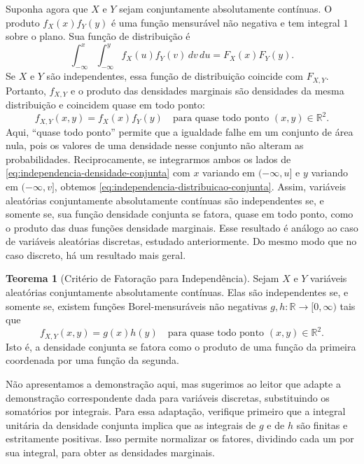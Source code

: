 \documentclass[12pt,portuguese]{article}
\theoremstyle{definition}
\newtheorem{theorem}{Teorema}
\theoremstyle{plainexercise}
\theoremstyle{starredexercise}
\theoremstyle{definition}
\begin{document}
Suponha agora que $X$ e $Y$ sejam conjuntamente absolutamente contínuas.
O produto $f_X(x)f_Y(y)$ é uma função mensurável não negativa e tem
integral $1$ sobre o plano. Sua função de distribuição é
\[
  \int_{-\infty}^{x}\int_{-\infty}^{y}
  f_X(u)f_Y(v)\,dv\,du = F_X(x)F_Y(y).
\]
Se $X$ e $Y$ são independentes, essa função de distribuição coincide com
$F_{X,Y}$. Portanto, $f_{X,Y}$ e o produto das densidades marginais são
densidades da mesma distribuição e coincidem quase em todo ponto:
\begin{equation}\label{eq:independencia-densidade-conjunta}
  f_{X,Y}(x, y) = f_X(x)f_Y(y)
  \quad \text{para quase todo ponto } (x,y) \in \mathbb{R}^2.
\end{equation}
Aqui, ``quase todo ponto'' permite que a igualdade falhe em um conjunto
de área nula, pois os valores de uma densidade nesse conjunto não alteram
as probabilidades. Reciprocamente, se
integrarmos ambos os lados de \eqref{eq:independencia-densidade-conjunta}
com $x$ variando em $(-\infty, u]$ e $y$ variando em $(-\infty, v]$,
obtemos \eqref{eq:independencia-distribuicao-conjunta}. Assim, variáveis
aleatórias conjuntamente absolutamente contínuas são independentes se,
e somente se, sua função densidade conjunta se fatora, quase em todo ponto,
como o produto das duas funções densidade marginais.
Esse resultado é análogo ao caso de variáveis
aleatórias discretas, estudado anteriormente. Do mesmo modo que no caso
discreto, há um resultado mais geral.

\begin{theorem}[Critério de Fatoração para Independência]\label{thm:criterio-fatoracao-independencia}
Sejam $X$ e $Y$ variáveis aleatórias conjuntamente absolutamente contínuas.
Elas são independentes se, e somente se, existem funções Borel-mensuráveis
não negativas $g,h:\mathbb{R}\to[0,\infty)$ tais que
\[
  f_{X,Y}(x, y) = g(x)h(y)
  \quad \text{para quase todo ponto } (x,y) \in \mathbb{R}^2.
\]
Isto é, a densidade conjunta se fatora como o produto de uma função da
primeira coordenada por uma função da segunda.
\end{theorem}

Não apresentamos a demonstração aqui, mas sugerimos ao leitor que adapte
a demonstração correspondente dada para variáveis discretas, substituindo os
somatórios por integrais. Para essa adaptação, verifique primeiro que a
integral unitária da densidade conjunta implica que as integrais de $g$ e
de $h$ são finitas e estritamente positivas. Isso permite normalizar os
fatores, dividindo cada um por sua integral, para obter as densidades marginais.
\end{document}

